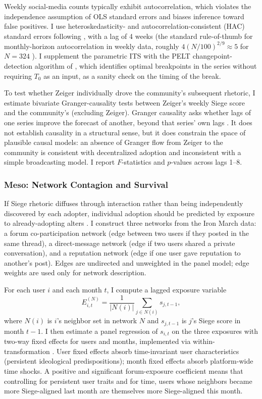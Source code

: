 \documentclass[bibtex,autowc,nonblind]{apsr_submission}
\begin{document}
Weekly social-media counts typically exhibit autocorrelation, which violates the independence assumption of OLS standard errors and biases inference toward false positives. I use heteroskedasticity- and autocorrelation-consistent (HAC) standard errors following \citet{newey1987simple}, with a lag of 4 weeks (the standard rule-of-thumb for monthly-horizon autocorrelation in weekly data, roughly $4 (N/100)^{2/9} \approx 5$ for $N = 324$ \citep{newey1994automatic, hamilton1994time}). I supplement the parametric ITS with the PELT changepoint-detection algorithm of \citet{killick2012optimal}, which identifies optimal breakpoints in the series without requiring $T_0$ as an input, as a sanity check on the timing of the break.

To test whether Zeiger individually drove the community's subsequent rhetoric, I estimate bivariate Granger-causality tests between Zeiger's weekly Siege score and the community's (excluding Zeiger). Granger causality asks whether lags of one series improve the forecast of another, beyond that series' own lags \citep{granger1969investigating, hamilton1994time}. It does not establish causality in a structural sense, but it does constrain the space of plausible causal models: an absence of Granger flow from Zeiger to the community is consistent with decentralized adoption and inconsistent with a simple broadcasting model. I report $F$-statistics and $p$-values across lags 1--8.

\subsubsection{Meso: Network Contagion and Survival}

If Siege rhetoric diffuses through interaction rather than being independently discovered by each adopter, individual adoption should be predicted by exposure to already-adopting alters \citep{rogers2003diffusion, valente1996network, centola2010spread, christakis2007spread}. I construct three networks from the Iron March data: a forum co-participation network (edge between two users if they posted in the same thread), a direct-message network (edge if two users shared a private conversation), and a reputation network (edge if one user gave reputation to another's post). Edges are undirected and unweighted in the panel model; edge weights are used only for network description.

For each user $i$ and each month $t$, I compute a lagged exposure variable
\[
E_{i,t}^{(N)} = \frac{1}{|N(i)|} \sum_{j \in N(i)} s_{j, t-1},
\]
where $N(i)$ is $i$'s neighbor set in network $N$ and $s_{j, t-1}$ is $j$'s Siege score in month $t-1$. I then estimate a panel regression of $s_{i,t}$ on the three exposures with two-way fixed effects for users and months, implemented via within-transformation \citep{wooldridge2010econometric, angrist2009mostly}. User fixed effects absorb time-invariant user characteristics (persistent ideological predispositions); month fixed effects absorb platform-wide time shocks. A positive and significant forum-exposure coefficient means that controlling for persistent user traits and for time, users whose neighbors became more Siege-aligned last month are themselves more Siege-aligned this month.
\end{document}
